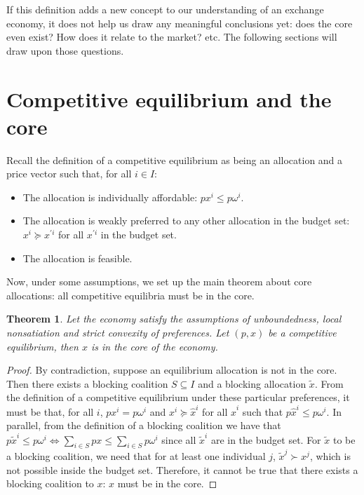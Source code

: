 \documentclass[12pt]{report}
\newtheorem{theorem}{Theorem}[chapter]
\begin{document}
If this definition adds a new concept to our understanding of an exchange economy, it does not help us draw any meaningful conclusions yet: does the core even exist? How does it relate to the market? etc. The following sections will draw upon those questions.

\section{Competitive equilibrium and the core}

Recall the definition of a competitive equilibrium as being an allocation and a price vector such that, for all $i\in I$:\begin{itemize}
\item The allocation is individually affordable: $px^i\leq p\omega^i$.
\item The allocation is weakly preferred to any other allocation in the budget set: $x^i\succeq x^{'i}$ for all $x^{'i}$ in the budget set.
\item The allocation is feasible.
\end{itemize}

Now, under some assumptions, we set up the main theorem about core allocations: all competitive equilibria must be in the core.

\begin{theorem}
Let the economy satisfy the assumptions of unboundedness, local nonsatiation and strict convexity of preferences. Let $(p, x)$ be a competitive equilibrium, then $x$ is in the core of the economy.
\end{theorem}

\begin{proof}
By contradiction, suppose an equilibrium allocation is not in the core. Then there exists a blocking coalition $S\subseteq I$ and a blocking allocation $\tilde x$. From the definition of a competitive equilibrium under these particular preferences, it must be that, for all $i$, $ p x^i = p \omega^i $ and $x^i \succeq \hat x^i$ for all $\hat x^i$ such that $p \hat x^i \leq p \omega^i$. In parallel, from the definition of a blocking coalition we have that $ p \tilde x^i \leq p \omega^i \Leftrightarrow \sum_{i\in S} px \leq \sum_{i\in S} p\omega^i$ since all $\tilde x^i$ are in the budget set. For $\tilde x$ to be a blocking coalition, we need that for at least one individual $j$, $\tilde x^j\succ x^j$, which is not possible inside the budget set. Therefore, it cannot be true that there exists a blocking coalition to $x$: $x$ must be in the core.
\end{proof}
\end{document}
